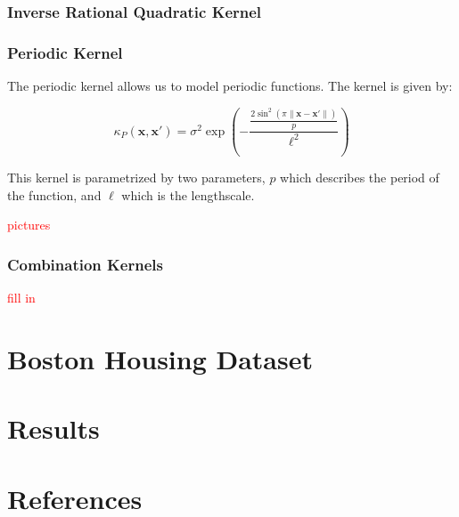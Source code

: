 \documentclass{article}
\newcommand{\bx}{\boldsymbol{x}}
\newcommand{\todo}[1]{\textcolor{red}{#1}}
\begin{document}
\subsubsection{Inverse Rational Quadratic Kernel}

\subsubsection{Periodic Kernel}

The periodic kernel allows us to model periodic functions. The kernel is given by:

\[
  \kappa_{P}(\bx, \bx') = \sigma^{2}  \exp(- \frac{\frac{2 \sin^{2}(\pi \|\bx - \bx'\|)}{p}}{\ell^{2}})
\]

This kernel is parametrized by two parameters, $p$ which describes the period of the function, and $\ell$ which is the
lengthscale\cite{duvenaud_automatic_2014}.

\todo{pictures}

\subsubsection{Combination Kernels}

\todo{fill in}

\section{Boston Housing Dataset}

\section{Results}

\section*{References}

\medskip

\small


\end{document}
